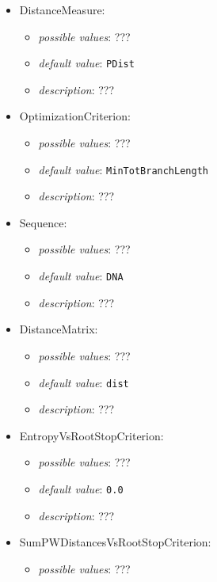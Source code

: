 \documentclass{article}
\begin{document}
\begin{itemize}
    \item DistanceMeasure:
           \begin{itemize}
                \item \emph{possible values}: ???
                \item \emph{default value}: \texttt{PDist}
                \item \emph{description}: ???
           \end{itemize}
    \item OptimizationCriterion:
           \begin{itemize}
                \item \emph{possible values}: ???
                \item \emph{default value}: \texttt{MinTotBranchLength}
                \item \emph{description}: ???
           \end{itemize}
    \item Sequence:
           \begin{itemize}
                \item \emph{possible values}: ???
                \item \emph{default value}: \texttt{DNA}
                \item \emph{description}: ???
           \end{itemize}
    \item DistanceMatrix:
           \begin{itemize}
                \item \emph{possible values}: ???
                \item \emph{default value}: \texttt{dist}
                \item \emph{description}: ???
           \end{itemize}
    \item EntropyVsRootStopCriterion:
           \begin{itemize}
                \item \emph{possible values}: ???
                \item \emph{default value}: \texttt{0.0}
                \item \emph{description}: ???
           \end{itemize}
    \item SumPWDistancesVsRootStopCriterion:
           \begin{itemize}
                \item \emph{possible values}: ???

\end{itemize}
\end{itemize}
\end{document}
